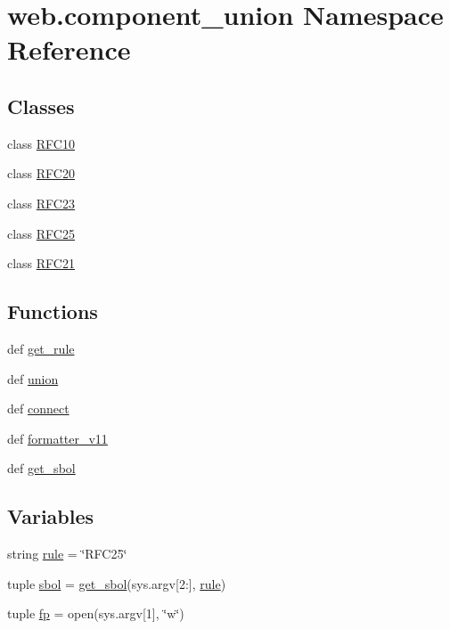 \hypertarget{namespaceweb_1_1component__union}{\section{web.\-component\-\_\-union Namespace Reference}
\label{namespaceweb_1_1component__union}
}
\subsection*{Classes}
\begin{DoxyCompactItemize}
\item 
class \hyperlink{classweb_1_1component__union_1_1_r_f_c10}{R\-F\-C10}
\item 
class \hyperlink{classweb_1_1component__union_1_1_r_f_c20}{R\-F\-C20}
\item 
class \hyperlink{classweb_1_1component__union_1_1_r_f_c23}{R\-F\-C23}
\item 
class \hyperlink{classweb_1_1component__union_1_1_r_f_c25}{R\-F\-C25}
\item 
class \hyperlink{classweb_1_1component__union_1_1_r_f_c21}{R\-F\-C21}
\end{DoxyCompactItemize}
\subsection*{Functions}
\begin{DoxyCompactItemize}
\item 
def \hyperlink{namespaceweb_1_1component__union_a31a00f66a21dce9973d070928a5b9c96}{get\-\_\-rule}
\item 
def \hyperlink{namespaceweb_1_1component__union_a618bdcac0531c3cf9509edaed5f5185e}{union}
\item 
def \hyperlink{namespaceweb_1_1component__union_abac54baf9bb5a74bb60aeb93adaa58c0}{connect}
\item 
def \hyperlink{namespaceweb_1_1component__union_a3aef7f09818a440458fc00d8538b2e9f}{formatter\-\_\-v11}
\item 
def \hyperlink{namespaceweb_1_1component__union_a4c3d4facdbfae5f7dcc65b3548af7382}{get\-\_\-sbol}
\end{DoxyCompactItemize}
\subsection*{Variables}
\begin{DoxyCompactItemize}
\item 
string \hyperlink{namespaceweb_1_1component__union_a09dd22f423bf9b8b35c70dcd05010e4f}{rule} = \char`\"{}R\-F\-C25\char`\"{}
\item 
tuple \hyperlink{namespaceweb_1_1component__union_a1c39ec4e56348057924a5e34290eb87c}{sbol} = \hyperlink{namespaceweb_1_1component__union_a4c3d4facdbfae5f7dcc65b3548af7382}{get\-\_\-sbol}(sys.\-argv\mbox{[}2\-:\mbox{]}, \hyperlink{namespaceweb_1_1component__union_a09dd22f423bf9b8b35c70dcd05010e4f}{rule})
\item 
tuple \hyperlink{namespaceweb_1_1component__union_a9642c72545ebbae7984a6dab04d32be0}{fp} = open(sys.\-argv\mbox{[}1\mbox{]}, \char`\"{}w\char`\"{})
\end{DoxyCompactItemize}



